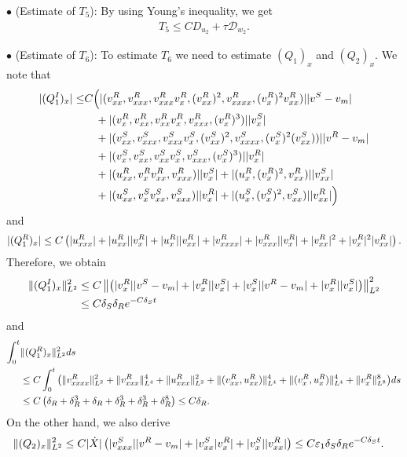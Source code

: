 \documentclass[11pt,reqno]{amsart}
\begin{document}
\begin{appendix}
\noindent $\bullet$ (Estimate of $T_5$):  By using Young's inequality, we get
\begin{align*}
T_5 \le C D_{u_2} + \tau \mathcal{D}_{w_2}.
\end{align*}


\noindent $\bullet$ (Estimate of $T_6$): 
To estimate $T_{6}$ we need to estimate $(Q_1)_x$ and $(Q_2)_x$. We note that
\begin{align*}
|(Q_1^I)_x| \le& C\Big( |(v^R_{xx},v^R_{xxx},v^R_{xxx}v^R_x,(v^R_{xx})^2,v^R_{xxxx},(v^R_x)^2v^R_{xx})| |v^S-v_m| \\ 
&\quad + |(v^R_x,v^R_{xx},v^R_{xx}v^R_x,v^R_{xxx},(v^R_x)^3)| |v^S_x|\\
&\quad + |(v^S_{xx},v^S_{xxx},v^S_{xxx}v^S_x,(v^S_{xx})^2,v^S_{xxxx},(v^S_x)^2(v^S_{xx}))| | v^R-v_m|  \\
&\quad +|(v^S_x,v^S_{xx},v^S_{xx}v^S_x,v^S_{xxx},(v^S_x)^3)| |v^R_x| \\ 
&\quad +|( u^R_{xx},v^R_x v^R_{xx},v^R_{xxx})| |v^S_x| +|( u^R_x,(v^R_x)^2,v^R_{xx})| |v^S_{xx}| \\ 
&\quad +|(u^S_{xx}, v^S_x v^S_{xx},v^S_{xxx})| |v^R_x|+|(u^S_x, (v^S_x)^2,v^S_{xx})| |v^R_{xx}|\Big)
\end{align*}
and 
\begin{equation*} %
|(Q_1^R)_x| \le C \left( |\ur_{xxx}| + |\ur_{xx}| |\vr_{x}|+ |\ur_{x}| |\vr_{xx}| +|\vr_{xxxx}|+|\vr_{xxx}| |\vr_{x}| +|\vr_{xx}|^2 + |\vr_{x}|^2|\vr_{xx}| \right).
\end{equation*}
Therefore, we obtain  
\begin{align*}
\|(Q^I_1)_x\|_{L^2}^2 &\le C \left\|\left( |v^R_x|  |v^S-v_m| + |v^R_x| |v^S_x| +  |v^S_x| |v^R-v_m| + |v^R_x| |v^S_x| \right)\right\|_{L^2}^2 \\ 
&\le C \delta_S \delta_R e^{-C \delta_S t}
\end{align*}
and
\begin{align*}
\int_0^t &\|(Q_1^R)_x\|_{L^2}^2 ds \\
&\le C \int_0^t
\big(\|v^R_{xxxx}\|_{L^2}^2+ \| v^R_{xxx}\|_{L^4}^4+\|u^R_{xxx}\|_{L^2}^2+ \|(v^R_{xx},u^R_{xx})\|_{L^4}^4  + \|(v^R_x,u^R_x)\|_{L^4}^4+ \|v^R_x\|_{L^8}^8 \big) ds\\
&\le C \left( \delta_R + \delta_R^3 + \delta_R + \delta_R^3 + \delta_R^3 + \delta_R^8 \right) \le C \delta_R.
\end{align*}
On the other hand, we also derive 
\begin{align*}
\| (Q_2)_x \|_{L^2}^2 &\le C |\dot{X}| \left( |\vs_{xxx}||\vr-v_m| +|\vs_{xx}|\vr_x| + |\vs_{x}| |\vr_{xx}|  \right) \le C \varepsilon_1 \delta_S \delta_R e^{-C \delta_S t}.

\end{align*}
\end{appendix}
\end{document}
